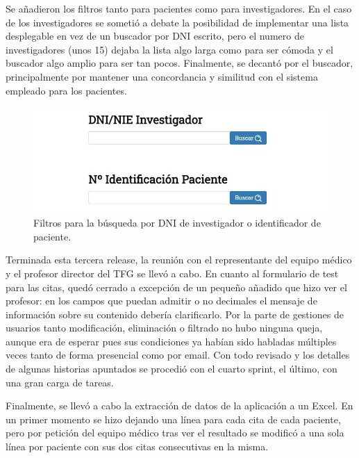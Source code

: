 Se añadieron los filtros tanto para pacientes como para investigadores. En el caso de los investigadores se sometió a debate la posibilidad de implementar una lista desplegable en vez de un buscador por DNI escrito, pero el numero de investigadores (unos 15) dejaba la lista algo larga como para ser cómoda y el buscador algo amplio para ser tan pocos. Finalmente, se decantó por el buscador, principalmente por mantener una concordancia y similitud con el sistema empleado para los pacientes.

\begin{figure}[h]
    \centering
     \includegraphics[width=1\textwidth]{images/filtros.jpg}
    \caption{Filtros para la búsqueda por DNI de investigador o identificador de paciente.}
\end{figure}

Terminada esta tercera release, la reunión con el representante del equipo médico y el profesor director del TFG se llevó a cabo. En cuanto al formulario de test para las citas, quedó cerrado a excepción de un pequeño añadido que hizo ver el profesor: en los campos que puedan admitir o no decimales el mensaje de información sobre su contenido debería clarificarlo. Por la parte de gestiones de usuarios tanto modificación, eliminación o filtrado no hubo ninguna queja, aunque era de esperar pues sus condiciones ya habían sido habladas múltiples veces tanto de forma presencial como por email. Con todo revisado y los detalles de algunas historias apuntados se procedió con el cuarto sprint, el último, con una gran carga de tareas.
\newline

Finalmente, se llevó a cabo la extracción de datos de la aplicación a un Excel. En un primer momento se hizo dejando una línea para cada cita de cada paciente, pero por petición del equipo médico tras ver el resultado se modificó a una sola línea por paciente con sus dos citas consecutivas en la misma.

